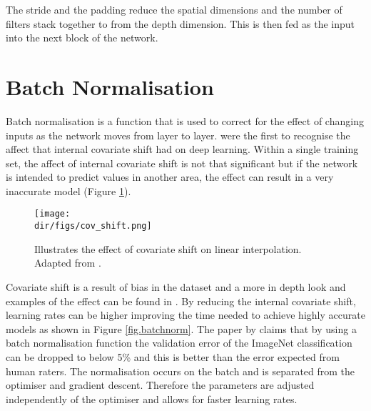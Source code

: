 The stride and the padding reduce the spatial dimensions and the number of filters stack together to from the depth dimension. This is then fed as the input into the next block of the network.

\section{Batch Normalisation}
Batch normalisation is a function that is used to correct for the effect of changing inputs as the network moves from layer to layer. \citet{ioffe15} were the first to recognise the affect that internal covariate shift had on deep learning. Within a single training set, the affect of internal covariate shift is not that significant but if the network is intended to predict values in another area, the effect can result in a very inaccurate model (Figure \ref{fig.cov_shift}). 
\begin{figure}[htbp]
    \centering
    \texttt{[image: \\dir/figs/cov\_shift.png]}
    \caption[The effect of Covariate shift on a linear extrapolation]{Illustrates the effect of covariate shift on linear interpolation. Adapted from \cite{sugiyama08}.}
    \label{fig.cov_shift}
\end{figure}
Covariate shift is a result of bias in the dataset and a more in depth look and examples of the effect can be found in \citet{smola11}. By reducing the internal covariate shift, learning rates can be higher improving the time needed to achieve highly accurate models as shown in Figure \ref{fig.batchnorm}. The paper by \citet{ioffe15} claims that by using a batch normalisation function the validation error of the ImageNet classification can be dropped to below 5\% and this is better than the error expected from human raters. The normalisation occurs on the batch and is separated from the optimiser and gradient descent. Therefore the parameters are adjusted independently of the optimiser and allows for faster learning rates. \par

